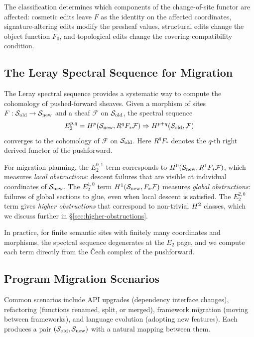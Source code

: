 \documentclass[11pt]{article}
\newcommand{\SiteOld}{\Site_{\mathrm{old}}}
\newcommand{\SiteNew}{\Site_{\mathrm{new}}}
\newcommand{\FunctorF}{F}
\newcommand{\Pushforward}{F_*}
\begin{document}
The classification determines which components of the change-of-site
functor are affected: cosmetic edits leave $\FunctorF$ as the identity on
the affected coordinates, signature-altering edits modify the presheaf
values, structural edits change the object function $\FunctorF_0$, and
topological edits change the covering compatibility condition.

\subsection{The Leray Spectral Sequence for Migration}\label{sec:leray}

The Leray spectral sequence provides a systematic way to compute the
cohomology of pushed-forward sheaves.  Given a morphism of sites
$\FunctorF : \SiteOld \to \SiteNew$ and a sheaf $\mathcal{F}$ on
$\SiteOld$, the spectral sequence
\[
  E_2^{p,q} = \Hcoh{p}(\SiteNew, R^q\Pushforward\mathcal{F})
  \Rightarrow \Hcoh{p+q}(\SiteOld, \mathcal{F})
\]
converges to the cohomology of $\mathcal{F}$ on $\SiteOld$.  Here
$R^q\Pushforward$ denotes the $q$-th right derived functor of the
pushforward.

For migration planning, the $E_2^{0,1}$ term corresponds to
$\Hcoh{0}(\SiteNew, R^1\Pushforward\mathcal{F})$, which measures
\emph{local obstructions}: descent failures that are visible at individual
coordinates of $\SiteNew$.  The $E_2^{1,0}$ term
$\Hcoh{1}(\SiteNew, \Pushforward\mathcal{F})$ measures \emph{global
obstructions}: failures of global sections to glue, even when local descent
is satisfied.  The $E_2^{2,0}$ term gives \emph{higher obstructions} that
correspond to non-trivial $H^{2}$ classes, which we discuss further in
§\ref{sec:higher-obstructions}.

In practice, for finite semantic sites with finitely many coordinates and
morphisms, the spectral sequence degenerates at the $E_2$ page, and we
compute each term directly from the \v{C}ech complex of the pushforward.

\subsection{Program Migration Scenarios}
Common scenarios include API upgrades (dependency interface changes),
refactoring (functions renamed, split, or merged), framework migration
(moving between frameworks), and language evolution (adopting new features).
Each produces a pair $(\SiteOld, \SiteNew)$ with a natural mapping between
them.
\end{document}
